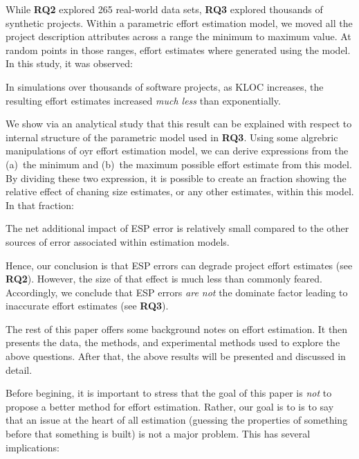 \documentclass[final,twocolumn]{elsarticle}
\theoremstyle{break}
\begin{document}
While {\bf RQ2} explored 265 real-world data sets, {\bf RQ3} explored thousands
of synthetic projects.  Within a parametric effort estimation model, we moved
all the project description attributes
across a range the minimum to maximum value. At random
points in those ranges, effort estimates where generated using the model.  In this
study, it was observed:

\begin{lesson0}
  In simulations over thousands of software projects,
  as KLOC increases, the resulting effort estimates increased {\em much less} than exponentially.
\end{lesson0}

We show via an analytical study 
that this result can be explained with respect to internal structure
of the parametric model used in {\bf RQ3}. Using some algrebric manipulations of
oyr effort estimation model,
we can derive expressions from
 the (a)~the minimum and (b)~the
maximum possible effort estimate from this model.
By dividing these two expression, it is possible to create an fraction showing
the relative effect of chaning size estimates, or any other estimates, within this model.
In that fraction:

\begin{lesson0}
  The net additional impact of ESP error is relatively small compared to the other sources of error associated within estimation models.
\end{lesson0}
Hence, our conclusion is that
ESP errors can degrade project
effort estimates (see {\bf RQ2}). However, the size of that effect is much less than commonly feared.
Accordingly, we conclude that  ESP errors {\em are not} the dominate factor leading
to inaccurate effort estimates (see {\bf RQ3}). 

The rest of this paper  offers some background notes on effort estimation.
It then presents the data, the methods, and experimental methods
used to explore the above questions. After that, the above results will be presented
and discussed in detail.

Before begining, it is important to stress
that the goal of this paper is {\em not} to propose a better method for effort
estimation.  Rather, our goal is to is to say that an issue at the heart of all
estimation (guessing the properties of something before that something is built)
is not a major problem. This has several implications:
\end{document}
